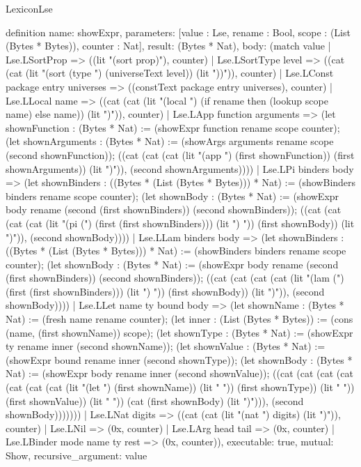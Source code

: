 \begin{lexlean}{LexiconLse}
\begin{semanticmodule}
definition{
  name: showExpr,
  parameters: [value : Lse, rename : Bool, scope : (List (Bytes * Bytes)), counter : Nat],
  result: (Bytes * Nat),
  body: (match value
    | Lse.LSortProp => ((lit "(sort prop)"), counter)
    | Lse.LSortType level => ((cat (cat (lit "(sort (type ") (universeText level)) (lit "))")), counter)
    | Lse.LConst package entry universes => ((constText package entry universes), counter)
    | Lse.LLocal name => ((cat (cat (lit "(local ") (if rename then (lookup scope name) else name)) (lit ")")), counter)
    | Lse.LApp function arguments => (let shownFunction : (Bytes * Nat) := (showExpr function rename scope counter); (let shownArguments : (Bytes * Nat) := (showArgs arguments rename scope (second shownFunction)); ((cat (cat (cat (lit "(app ") (first shownFunction)) (first shownArguments)) (lit ")")), (second shownArguments))))
    | Lse.LPi binders body => (let shownBinders : ((Bytes * (List (Bytes * Bytes))) * Nat) := (showBinders binders rename scope counter); (let shownBody : (Bytes * Nat) := (showExpr body rename (second (first shownBinders)) (second shownBinders)); ((cat (cat (cat (cat (lit "(pi (") (first (first shownBinders))) (lit ") ")) (first shownBody)) (lit ")")), (second shownBody))))
    | Lse.LLam binders body => (let shownBinders : ((Bytes * (List (Bytes * Bytes))) * Nat) := (showBinders binders rename scope counter); (let shownBody : (Bytes * Nat) := (showExpr body rename (second (first shownBinders)) (second shownBinders)); ((cat (cat (cat (cat (lit "(lam (") (first (first shownBinders))) (lit ") ")) (first shownBody)) (lit ")")), (second shownBody))))
    | Lse.LLet name ty bound body => (let shownName : (Bytes * Nat) := (fresh name rename counter); (let inner : (List (Bytes * Bytes)) := (cons (name, (first shownName)) scope); (let shownType : (Bytes * Nat) := (showExpr ty rename inner (second shownName)); (let shownValue : (Bytes * Nat) := (showExpr bound rename inner (second shownType)); (let shownBody : (Bytes * Nat) := (showExpr body rename inner (second shownValue)); ((cat (cat (cat (cat (cat (cat (cat (lit "(let ") (first shownName)) (lit " ")) (first shownType)) (lit " ")) (first shownValue)) (lit " ")) (cat (first shownBody) (lit ")"))), (second shownBody)))))))
    | Lse.LNat digits => ((cat (cat (lit "(nat ") digits) (lit ")")), counter)
    | Lse.LNil => (0x, counter)
    | Lse.LArg head tail => (0x, counter)
    | Lse.LBinder mode name ty rest => (0x, counter)),
  executable: true,
  mutual: Show,
  recursive_argument: value
}


\end{semanticmodule}
\end{lexlean}
